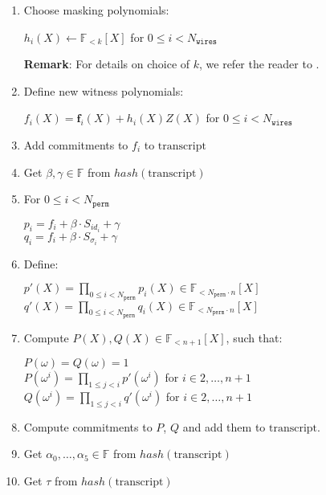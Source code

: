 \begin{enumerate}
    \item Choose masking polynomials:
    \begin{center}
        $h_i(X) \leftarrow \mathbb{F}_{<k}[X]$ for $0 \leq i < N_{\texttt{wires}}$
    \end{center}
    \textbf{Remark}: For details on choice of $k$, we refer the reader to \cite{cryptoeprint:2019:1400}.
    \item Define new witness polynomials:
    \begin{center}
        $f_i(X) = \textbf{f}_{i}(X) + h_i(X)Z(X)$ for $0 \leq i < N_{\texttt{wires}}$
    \end{center}
    \item Add commitments to $f_i$ to $\text{transcript}$
    \item Get $\beta, \gamma \in \mathbb{F}$ from $hash(\text{transcript})$
    \item For $0 \leq i < N_{\texttt{perm}}$
    \begin{center}
        $p_i = f_i + \beta \cdot S_{id_i} + \gamma$ \\
        $q_i = f_i + \beta \cdot S_{\sigma_i} + \gamma$
    \end{center}
    \item Define:
    \begin{center}
        $p'(X) = \prod\limits_{0 \leq i < N_{\texttt{perm}}} p_i(X) \in \mathbb{F}_{<N_{\texttt{perm}} \cdot n}[X]$ \\
        $q'(X) = \prod\limits_{0 \leq i < N_{\texttt{perm}}} q_i(X) \in \mathbb{F}_{<N_{\texttt{perm}} \cdot n}[X]$
    \end{center}
    \item Compute $P(X), Q(X) \in \mathbb{F}_{<n+1}[X]$, such that:
    \begin{center}
        $P(\omega) = Q(\omega) = 1$ \\
        $P(\omega^i) = \prod\limits_{1 \leq j < i}p'(\omega^i)$ for $i \in {2, \dots, n + 1}$ \\
        $Q(\omega^i) = \prod\limits_{1 \leq j < i}q'(\omega^i)$ for $i \in {2, \dots, n + 1}$ \\
    \end{center}
    \item Compute commitments to $P$, $Q$ and add them to $\text{transcript}$.
    \item Get $\alpha_0, \dots, \alpha_5 \in \mathbb{F}$ from $hash(\text{transcript})$
    \item Get $\tau$ from $hash(\text{transcript})$

\end{enumerate}
